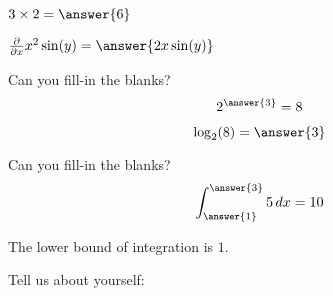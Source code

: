 \documentclass{ximera}
\begin{document}
\begin{problem}  
  $3\times 2 = \answer{6}$  
\end{problem} 

\begin{problem}  
  $\frac{\partial}{\partial x} x^2\sin(y) =  \answer{2x\sin(y)}$  
\end{problem} 

\begin{problem}
  Can you fill-in the blanks?
  \[
  2^{\answer{3}} = 8
  \]
  \begin{problem}
    \[
    \log_2(8) = \answer{3}
    \]
  \end{problem}
\end{problem}

\begin{problem}
  Can you fill-in the blanks?
  \[
  \int_{\answer{1}}^{\answer{3}}5 \, d x = 10
  \]
  \begin{hint}
    The lower bound of integration is $1$.
  \end{hint}
\end{problem}



\begin{problem}
  Tell us about yourself:
  \begin{freeResponse}
  \end{freeResponse}
\end{problem}
\end{document}
